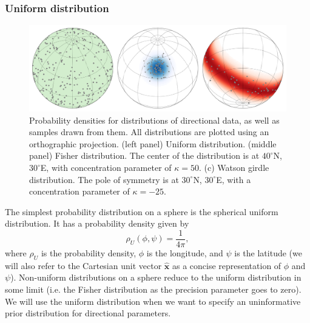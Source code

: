 \documentclass[11pt,letterpaper]{article}
\begin{document}
\subsubsection*{Uniform distribution}
\begin{figure}
\includegraphics[width=\textwidth]{fig_direction_distributions.png}
\caption[Spherical probability distributions.]{Probability densities for distributions of directional data, as well as samples drawn from them. All distributions are plotted using an orthographic projection. (left panel) Uniform distribution. (middle panel) Fisher distribution. The center of the distribution is at $40^\circ$N, $30^\circ$E, with concentration parameter of $\kappa=50$. (c) Watson girdle distribution. The pole of symmetry is at $30^\circ$N, $30^\circ$E, with a concentration parameter of $\kappa=-25$.}
\label{fig:distributions}
\end{figure}

The simplest probability distribution on a sphere is the spherical uniform distribution. It has a probability density given by
\begin{equation}
  \rho_U(\phi, \psi) = \frac{1}{4 \pi},
\end{equation}
where $\rho_U$ is the probability density, $\phi$ is the longitude, and $\psi$ is the latitude (we will also refer to the Cartesian unit vector $\hat{\mathbf{x}}$ as a concise representation of $\phi$ and $\psi$). Non-uniform distributions on a sphere reduce to the uniform distribution in some limit (i.e. the Fisher distribution as the precision parameter goes to zero). We will use the uniform distribution when we want to specify an uninformative prior distribution for directional parameters.
\end{document}

